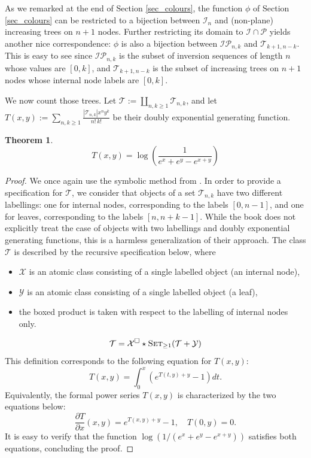 \documentclass[a4paper,11pt]{article}
\newtheorem{thm}{Theorem}
\theoremstyle{definition}
\theoremstyle{remark}
\newcommand{\I}{\mathcal{I}}
\renewcommand{\P}{\mathcal{P}}
\newcommand{\T}{\mathcal{T}}
\begin{document}
As we remarked at the end of Section \ref{sec_colours}, the function $\phi$ of Section \ref{sec_colours} can be restricted to a bijection between $\I_n$ and (non-plane) increasing trees on $n+1$ nodes. Further restricting its domain to $\I \cap \P$ yields another nice correspondence: $\phi$ is also a bijection between $\I\P_{n,k}$ and $\T_{k+1,n-k}$. This is easy to see since $\I\P_{n,k}$ is the subset of inversion sequences of length $n$ whose values are $[0,k]$, and $\T_{k+1,n-k}$ is the subset of increasing trees on $n+1$ nodes whose internal node labels are $[0,k]$.

We now count those trees. Let $\T := \coprod_{n,k \geq 1} \T_{n,k}$, and let $T(x,y) := \sum_{n,k \geq 1} \frac{|\T_{n,k}| x^n y^k}{n! \, k!}$ be their doubly exponential generating function.

\begin{thm} \label{thm_poly_Bernoulli}
    $$T(x,y) = \log \left (\frac{1}{e^x + e^y - e^{x+y}} \right )$$
\end{thm}
\begin{proof} 
We once again use the symbolic method from \cite[Part A]{Flajolet_Sedgewick}. In order to provide a specification for $\mathcal T$, we consider that objects of a set $\mathcal T_{n,k}$ have two different labellings: one for internal nodes, corresponding to the labels $[0,n-1]$, and one for leaves, corresponding to the labels $[n,n+k-1]$. While the book \cite{Flajolet_Sedgewick} does not explicitly treat the case of objects with two labellings and doubly exponential generating functions, this is a harmless generalization of their approach.
The class $\T$ is described by the recursive specification below, where
\begin{itemize}
    \item $\mathcal X$ is an atomic class consisting of a single labelled object (an internal node),
    \item $\mathcal Y$ is an atomic class consisting of a single labelled object (a leaf),
    \item the boxed product is taken with respect to the labelling of internal nodes only.
\end{itemize}
$$\T = \mathcal X^{\square} \star \textsc{Set}_{\geq 1}(\T +\mathcal Y)$$
This definition corresponds to the following equation for $T(x,y)$:
$$T(x,y) = \int_0^x (e^{T(t,y) + y} - 1) dt.$$
Equivalently, the formal power series $T(x,y)$ is characterized by the two equations below:
$$\frac{\partial T}{\partial x}(x,y) = e^{T(x,y) + y} -1, \quad T(0,y) = 0.$$
It is easy to verify that the function $\log \left (1/(e^x + e^y - e^{x+y}) \right )$ satisfies both equations, concluding the proof.
\end{proof}
\end{document}
